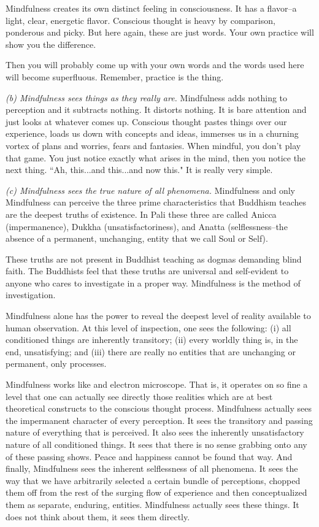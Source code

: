 Mindfulness creates its own distinct feeling in consciousness. It has a
flavor--a light, clear, energetic flavor. Conscious thought is heavy by
comparison, ponderous and picky. But here again, these are just words. Your own
practice will show you the difference.

Then you will probably come up with your own words and the words used here will
become superfluous. Remember, practice is the thing.

\emph{(b) Mindfulness sees things as they really are.} Mindfulness adds nothing to
perception and it subtracts nothing. It distorts nothing. It is bare attention and just looks at whatever comes up. Conscious
thought pastes things over our experience, loads us down with concepts and
ideas, immerses us in a churning vortex of plans and worries, fears and
fantasies. When mindful, you don't play that game. You just notice exactly what
arises in the mind, then you notice the next thing. ``Ah, this...and this...and
now this." It is really very simple.

\emph{(c) Mindfulness sees the true nature of all phenomena.} Mindfulness and only
Mindfulness can perceive the three prime characteristics that Buddhism teaches
are the deepest truths of existence. In Pali these three are called Anicca
(impermanence), Dukkha (unsatisfactoriness), and Anatta (selflessness--the
absence of a permanent, unchanging, entity that we call Soul or Self).

These truths are not present in Buddhist teaching as dogmas demanding blind
faith. The Buddhists feel that these truths are universal and self-evident to
anyone who cares to investigate in a proper way. Mindfulness is the method of
investigation.

Mindfulness alone has the power to reveal the deepest level of reality available
to human observation. At this level of inspection, one sees the following: (i)
all conditioned things are inherently transitory; (ii) every worldly thing is, in
the end, unsatisfying; and (iii) there are really no entities that are unchanging
or permanent, only processes.

Mindfulness works like and electron microscope. That is, it operates on so fine
a level that one can actually see directly those realities which are at best
theoretical constructs to the conscious thought process. Mindfulness actually
sees the impermanent character of every perception. It sees the transitory and
passing nature of everything that is perceived. It also sees the inherently
unsatisfactory nature of all conditioned things. It sees that there is no sense
grabbing onto any of these passing shows. Peace and happiness cannot be found
that way. And finally, Mindfulness sees the inherent selflessness of all
phenomena. It sees the way that we have arbitrarily selected a certain bundle of
perceptions, chopped them off from the rest of the surging flow of experience
and then conceptualized them as separate, enduring, entities. Mindfulness
actually sees these things. It does not think about them, it sees them directly.

